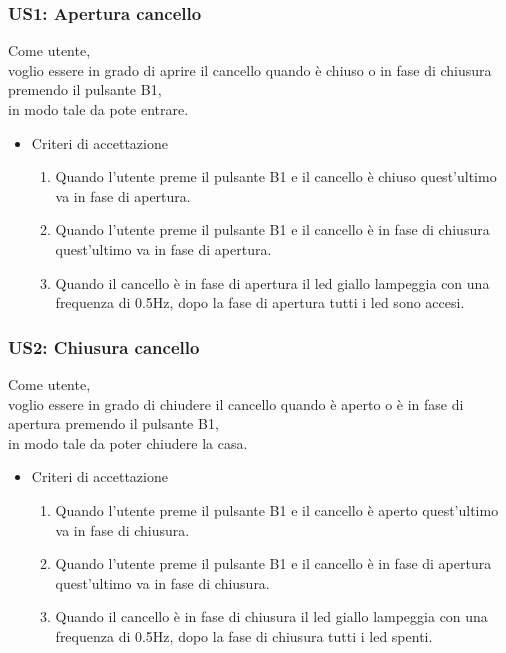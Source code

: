 \documentclass[12pt]{article}
\begin{document}
\subsubsection{US1: Apertura cancello}
Come utente, \\
voglio essere in grado di aprire il cancello quando è chiuso o in fase di chiusura premendo il pulsante B1, \\
in modo tale da pote entrare.
\begin{itemize}
    \item Criteri di accettazione
    \begin{enumerate}
        \item Quando l'utente preme il pulsante B1 e il cancello è chiuso quest'ultimo va in fase di apertura.
        \item Quando l'utente preme il pulsante B1 e il cancello è in fase di chiusura quest'ultimo va in fase di apertura.
        \item Quando il cancello è in fase di apertura il led giallo lampeggia con una frequenza di 0.5Hz, dopo la fase di apertura tutti i led sono accesi.
    \end{enumerate}
\end{itemize}
\subsubsection{US2: Chiusura cancello}
Come utente, \\
voglio essere in grado di chiudere il cancello quando è aperto o è in fase di apertura premendo il pulsante B1, \\
in modo tale da poter chiudere la casa.
\begin{itemize}
    \item Criteri di accettazione
    \begin{enumerate}
        \item Quando l'utente preme il pulsante B1 e il cancello è aperto quest'ultimo va in fase di chiusura.
        \item Quando l'utente preme il pulsante B1 e il cancello è in fase di apertura quest'ultimo va in fase di chiusura.
        \item Quando il cancello è in fase di chiusura il led giallo lampeggia con una frequenza di 0.5Hz, dopo la fase di chiusura tutti i led spenti.
    \end{enumerate}
\end{itemize}
\end{document}
